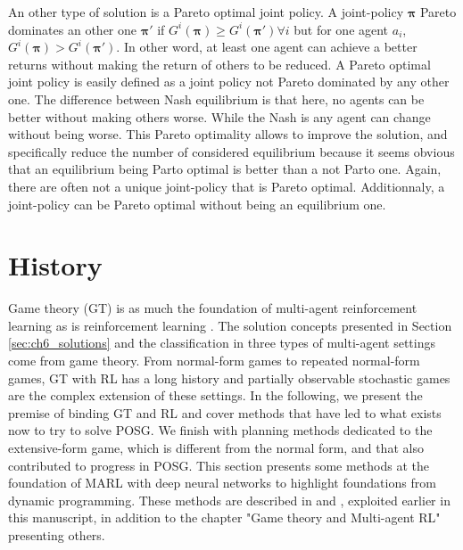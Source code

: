 An other type of solution is a Pareto optimal joint policy.
A joint-policy $\mathbf{\pi}$ Pareto dominates an other one $\mathbf{\pi'}$ if $G^i(\mathbf{\pi}) \ge G^i(\mathbf{\pi'})\forall i$ but for one agent $a_i$, $G^i(\mathbf{\pi}) > G^i(\mathbf{\pi'})$.
In other word, at least one agent can achieve a better returns without making the return of others to be reduced.
A Pareto optimal joint policy is easily defined as a joint policy not Pareto dominated by any other one.
The difference between Nash equilibrium is that here, no agents can be better without making others worse.
While the Nash is any agent can change without being worse.
This Pareto optimality allows to improve the solution, and specifically reduce the number of considered equilibrium because it seems obvious that an equilibrium being Parto optimal is better than a not Parto one.
Again, there are often not a unique joint-policy that is Pareto optimal.
Additionnaly, a joint-policy can be Pareto optimal without being an equilibrium one.



\section{History}\label{sec:ch6_history}
Game theory (GT) \citep{von1947theory} is as much the foundation of multi-agent reinforcement learning as is reinforcement learning \citep{Nowe2012GTMARL, marl-book}.
The solution concepts presented in Section \ref{sec:ch6_solutions} and the classification in three types of multi-agent settings come from game theory.
From normal-form games to repeated normal-form games, GT with RL has a long history and partially observable stochastic games are the complex extension of these settings.
In the following, we present the premise of binding GT and RL and cover methods that have led to what exists now to try to solve POSG.
We finish with planning methods dedicated to the extensive-form game, which is different from the normal form, and that also contributed to progress in POSG.
This section presents some methods at the foundation of MARL with deep neural networks to highlight foundations from dynamic programming.
These methods are described in \citep{marl-book} and \citep{russel2010}, exploited earlier in this manuscript, in addition to the chapter "Game theory and Multi-agent RL" \citep{Nowe2012GTMARL} presenting others.

